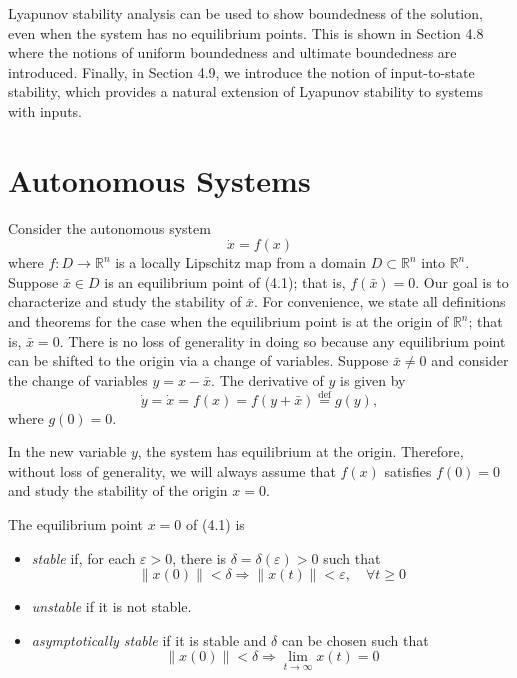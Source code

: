 Lyapunov stability analysis can be used to show boundedness of the solution, even when the system has no equilibrium points. This is shown in Section 4.8 where the notions of uniform boundedness and ultimate boundedness are introduced. Finally, in Section 4.9, we introduce the notion of input-to-state stability, which provides a natural extension of Lyapunov stability to systems with inputs.

\section{Autonomous Systems}

Consider the autonomous system
\begin{equation}
\dot{x} = f(x)
\tag{4.1}
\end{equation}
where $f : D \to \mathbb{R}^n$ is a locally Lipschitz map from a domain $D \subset \mathbb{R}^n$ into $\mathbb{R}^n$. Suppose $\bar{x} \in D$ is an equilibrium point of (4.1); that is, $f(\bar{x}) = 0$. Our goal is to characterize and study the stability of $\bar{x}$. For convenience, we state all definitions and theorems for the case when the equilibrium point is at the origin of $\mathbb{R}^n$; that is, $\bar{x} = 0$. There is no loss of generality in doing so because any equilibrium point can be shifted to the origin via a change of variables. Suppose $\bar{x} \neq 0$ and consider the change of variables $y = x - \bar{x}$. The derivative of $y$ is given by
\[
\dot{y} = \dot{x} = f(x) = f(y + \bar{x}) \stackrel{\text{def}}{=} g(y),
\]
where $g(0) = 0$.

In the new variable $y$, the system has equilibrium at the origin. Therefore, without loss of generality, we will always assume that $f(x)$ satisfies $f(0) = 0$ and study the stability of the origin $x = 0$.

\medskip

\noindent
{} The equilibrium point $x = 0$ of (4.1) is
\begin{itemize}
\item \emph{stable} if, for each $\varepsilon > 0$, there is $\delta = \delta(\varepsilon) > 0$ such that
\[
\|x(0)\| < \delta \Rightarrow \|x(t)\| < \varepsilon, \quad \forall t \ge 0
\]
\item \emph{unstable} if it is not stable.
\item \emph{asymptotically stable} if it is stable and $\delta$ can be chosen such that
\[
\|x(0)\| < \delta \Rightarrow \lim_{t \to \infty} x(t) = 0
\]
\end{itemize}

